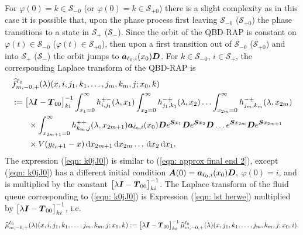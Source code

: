 For \(\varphi(0)=k\in\mathcal S_{-0}\) (or \(\varphi(0)=k\in\mathcal S_{+0}\)) there is a slight complexity as in this case it is possible that, upon the phase process first leaving \(\mathcal S_{-0}\) (\(\mathcal S_{+0}\)) the phase transitions to a state in \(\mathcal S_+\) (\(\mathcal S_-\)). Since the orbit of the QBD-RAP is constant on \(\varphi(t)\in\mathcal S_{-0}\) (\(\varphi(t)\in\mathcal S_{+0}\)), then upon a first transition out of \(\mathcal S_{-0}\) (\(\mathcal S_{+0}\)) and into \(\mathcal S_+\) (\(\mathcal S_-\)) the orbit jumps to \(\boldsymbol   a_{\ell_0,i}(x_0)\boldsymbol D\). For \(k\in\mathcal S_{-0}\), \(i\in\mathcal S_+\), the corresponding Laplace transform of the QBD-RAP is
\begin{align}
	&\widehat{f}_{m,-0,+}^{\ell_0}(\lambda)(x,i,j_1,k_1,\dots,j_m,k_m,j;x_0,k)\nonumber 
	\\&:=\begin{bmatrix} \lambda \boldsymbol I - \boldsymbol T_{00} \end{bmatrix}^{-1}_{ki}\int_{x_1=0}^\infty h^{+-}_{i,j_{1}}(\lambda,x_1)\nonumber
	\int_{x_2=0}^\infty h^{-+}_{j_1,k_1}(\lambda,x_2)
	\hdots \int_{x_{2m}=0}^\infty h^{-+}_{j_{m},k_m}(\lambda, x_{2m})  
	\\&\qquad \times\int_{x_{2m+1}=0}^\infty h^{++}_{k_m,j}(\lambda,x_{2m+1})
	 \boldsymbol   a_{\ell_0,i}(x_0)\boldsymbol De^{\boldsymbol{S}x_1} \boldsymbol{D} e^{\boldsymbol{S}x_2} \boldsymbol{D}\dots e^{\boldsymbol{S}x_{2m}}  \boldsymbol{D}e^{\boldsymbol{S}x_{2m+1}} \nonumber 
	 \\&\qquad{}\times V(y_{\ell_0+1}-x)  \, \mathrm{d} x_{2m+1} \, \mathrm{d} x_{2m}\dots\, \mathrm{d} x_2 \, \mathrm{d} x_1.\label{eqn: k0jJ0}
\end{align}
The expression (\ref{eqn: k0jJ0}) is similar to (\ref{eqn: approx final end 2}), except (\ref{eqn: k0jJ0}) has a different initial condition \(\boldsymbol A(0) = \boldsymbol   a_{\ell_0,i}(x_0)\boldsymbol D,\) \(\varphi(0)=i\), and is multiplied by the constant \(\begin{bmatrix} \lambda \boldsymbol I - \boldsymbol T_{00} \end{bmatrix}^{-1}_{ki}\). 
The Laplace transform of the fluid queue corresponding to (\ref{eqn: k0jJ0}) is Expression (\ref{eqn: lst herwe}) multiplied by \(\begin{bmatrix} \lambda \boldsymbol I - \boldsymbol T_{00} \end{bmatrix}^{-1}_{ki}\), i.e.
\[\widehat \mu_{m,-0,+}^{\ell_0}(\lambda)(x,i,j_1,k_1,\dots,j_m,k_m,j;x_0,k) := \begin{bmatrix} \lambda \boldsymbol I - \boldsymbol T_{00} \end{bmatrix}^{-1}_{ki}\widehat \mu_{m,-0,+}^{\ell_0}(\lambda)(x,j_1,k_1,\dots,j_m,k_m,j;x_0,i).\]

